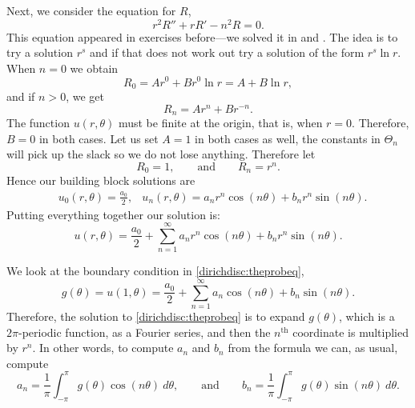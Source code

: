 \documentclass[12pt]{book}
\begin{document}
Next, we consider the equation for $R$,
\begin{equation*}
r^2 R'' + r R' - n^2 R = 0.
\end{equation*}
This equation appeared in exercises before---we
solved it in 
and .  The idea is to try a solution
$r^s$ and if that does not work out try a solution of the form
$r^s \ln r$.  When $n=0$ we obtain
\begin{equation*}
R_0 = A r^0 + B r^0 \ln r = A + B \ln r ,
\end{equation*}
and if $n > 0$, we get
\begin{equation*}
R_n = A r^n + B r^{-n} .
\end{equation*}
The function $u(r,\theta)$ must be finite at the origin, that is, when $r=0$.
Therefore, $B=0$ in both
cases.  Let us set $A=1$ in both cases as well, the constants in $\Theta_n$
will pick up the slack so we do not lose anything.  Therefore let
\begin{equation*}
R_0 = 1 , \qquad \text{and} \qquad
R_n = r^n .
\end{equation*}
Hence our building block solutions are
\begin{align*}
& u_0(r,\theta) = \frac{a_0}{2} ,
& u_n(r,\theta) = a_n r^n \cos(n \theta) + b_n r^n \sin(n \theta) .
\end{align*}
Putting everything together our solution is:
\begin{equation*}
\boxed{~~
u(r,\theta)
=
\frac{a_0}{2} +
\sum_{n=1}^\infty
a_n r^n \cos(n \theta) + b_n r^n \sin(n \theta) .
~~}
\end{equation*}

We look at the boundary condition in \eqref{dirichdisc:theprobeq},
\begin{equation*}
g(\theta) = u(1,\theta)
=
\frac{a_0}{2} +
\sum_{n=1}^\infty
a_n \cos(n \theta) + b_n \sin(n \theta) .
\end{equation*}
Therefore, the solution to \eqref{dirichdisc:theprobeq}
is to expand $g(\theta)$, which is 
a $2\pi$-periodic function, as a Fourier series, and then 
the $n^{\text{th}}$ coordinate is multiplied by $r^n$.  In other words, to
compute $a_n$ and $b_n$ from the formula we can, as usual, compute
\begin{equation*}
a_n =
\frac{1}{\pi} \int_{-\pi}^\pi g(\theta) \cos (n\theta) ~ d\theta , \qquad
\text{and} \qquad
b_n =
\frac{1}{\pi} \int_{-\pi}^\pi g(\theta) \sin (n\theta) ~ d\theta.
\end{equation*}
\end{document}
